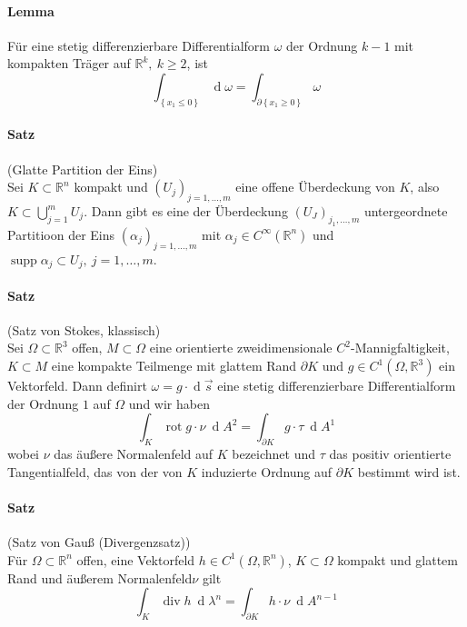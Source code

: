\documentclass[12pt,a4paper,fleqn]{article}
\def\set#1{{\left\{ #1 \right\}}}
\def\R{{\mathbb{R}}}
\def\d{{\operatorname{d}}}
\begin{document}
\paragraph{Lemma} Für eine stetig differenzierbare Differentialform $\omega$ der Ordnung $k-1$ mit kompakten Träger auf $\R^k,\ k\geq 2$, ist 
\begin{displaymath}
\int_{\set{x_1\leq 0}} \d \omega = \int_{\partial \set{x_1 \geq 0}} \omega
\end{displaymath}

\paragraph{Satz} (Glatte Partition der Eins)\\
Sei $K\subset \R^n$ kompakt und $(U_j)_{j=1, \dots, m}$ eine offene Überdeckung von $K$, also ${K\subset\bigcup_{j=1}^m U_j}$. Dann gibt es eine der Überdeckung $(U_J)_{j_1, \dots, m}$ untergeordnete Partitioon der Eins $(\alpha_j)_{j=1, \dots, m}$ mit $\alpha_j \in C^\infty(\R^n)$ und $\operatorname{supp} \alpha_j \subset U_j,\ j=1, \dots, m$.

\paragraph{Satz} (Satz von Stokes, klassisch)\\
Sei $\Omega\subset\R^3$ offen, $M\subset \Omega$ eine orientierte zweidimensionale $C^2$-Mannigfaltigkeit, $K\subset M$ eine kompakte Teilmenge mit glattem Rand $\partial K$ und $g\in C^1(\Omega, \R^3)$ ein Vektorfeld. Dann definirt $\omega=g\cdot\d \overrightarrow{s}$ eine stetig differenzierbare Differentialform der Ordnung $1$ auf $\Omega$ und wir haben
\begin{displaymath}
\int_K \operatorname{rot} g \cdot \nu\ \d A^2 = \int_{\partial K} g \cdot \tau\ \d A^1
\end{displaymath}
wobei $\nu$ das äußere Normalenfeld auf $K$ bezeichnet und $\tau$ das positiv orientierte Tangentialfeld, das von der von $K$ induzierte Ordnung auf $\partial K$ bestimmt wird ist.

\paragraph{Satz} (Satz von Gauß (Divergenzsatz))\\
Für $\Omega \subset \R^n$ offen, eine Vektorfeld $h \in C^1(\Omega, \R^n)$, $K\subset \Omega$ kompakt und glattem Rand und äußerem Normalenfeld$\nu$ gilt
\begin{displaymath}
\int_K \operatorname{div} h\ \d\lambda^n = \int_{\partial K} h \cdot \nu\ \d A^{n-1}
\end{displaymath}
\end{document}
